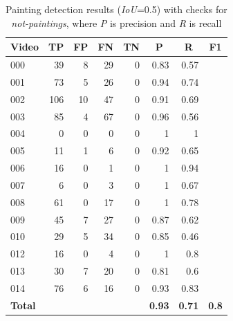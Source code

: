 \documentclass[10pt,twocolumn,letterpaper]{article}
\begin{document}
\begin{table}[]
\begin{center}
\begin{tabular}{lrrrrrrr}
\multicolumn{1}{c}{\textbf{Video}} & \multicolumn{1}{c}{\textbf{TP}} & \multicolumn{1}{c}{\textbf{FP}} & \multicolumn{1}{c}{\textbf{FN}} & \multicolumn{1}{c}{\textbf{TN}} & \multicolumn{1}{c}{\textbf{P}} & \multicolumn{1}{c}{\textbf{R}} & \multicolumn{1}{c}{\textbf{F1}} \\ \hline \hline
000 & 39 & 8 & 29 & 0 & 0.83 & 0.57 &  \\
001 & 73 & 5 & 26 & 0 & 0.94 & 0.74 &  \\
002 & 106 & 10 & 47 & 0 & 0.91 & 0.69 &  \\
003 & 85 & 4 & 67 & 0 & 0.96 & 0.56 &  \\
004 & 0 & 0 & 0 & 0 & 1 & 1 &  \\
005 & 11 & 1 & 6 & 0 & 0.92 & 0.65 &  \\
006 & 16 & 0 & 1 & 0 & 1 & 0.94 &  \\
007 & 6 & 0 & 3 & 0 & 1 & 0.67 &  \\
008 & 61 & 0 & 17 & 0 & 1 & 0.78 &  \\
009 & 45 & 7 & 27 & 0 & 0.87 & 0.62 &  \\
010 & 29 & 5 & 34 & 0 & 0.85 & 0.46 &  \\
012 & 16 & 0 & 4 & 0 & 1 & 0.8 &  \\
013 & 30 & 7 & 20 & 0 & 0.81 & 0.6 &  \\
014 & 76 & 6 & 16 & 0 & 0.93 & 0.83 &  \\ \hline \hline
\textbf{Total} &  &  &  &  & \textbf{0.93} &\textbf{ 0.71} & \textbf{0.8} \\
\end{tabular}
\end{center}
\caption{Painting detection results (\textit{IoU}=0.5) with checks for \textit{not-paintings}, where \textit{P} is precision and \textit{R} is recall}
\label{tab:PaintingDetectionResults1}
\end{table}
\end{document}
